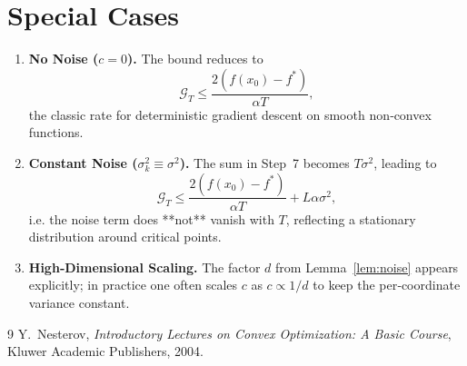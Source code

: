 \documentclass{article}
\begin{document}
\section*{Special Cases}
\begin{enumerate}[label=\alph*)]
\item \textbf{No Noise ($c=0$).} The bound reduces to
\[
\mathcal G_{T}\le \frac{2(f(x_{0})-f^{*})}{\alpha T},
\]
the classic rate for deterministic gradient descent on smooth non‑convex functions.

\item \textbf{Constant Noise ($\sigma_{k}^{2}\equiv\sigma^{2}$).} The sum in Step~7 becomes $T\sigma^{2}$, leading to
\[
\mathcal G_{T}\le \frac{2(f(x_{0})-f^{*})}{\alpha T}+L\alpha\sigma^{2},
\]
i.e. the noise term does **not** vanish with $T$, reflecting a stationary distribution around critical points.

\item \textbf{High‑Dimensional Scaling.} The factor $d$ from Lemma~\ref{lem:noise} appears explicitly; in practice one often scales $c$ as $c\propto 1/d$ to keep the per‑coordinate variance constant.
\end{enumerate}

\begin{thebibliography}{9}
Y.~Nesterov, \emph{Introductory Lectures on Convex Optimization: A Basic Course}, Kluwer Academic Publishers, 2004.
\end{thebibliography}
\end{document}

